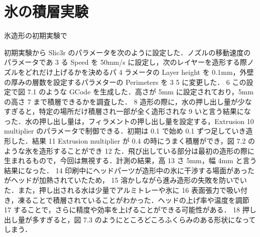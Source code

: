 \section{氷の積層実験}
\label{sec:paragraph}
氷造形の初期実験で




初期実験から Slic3r のパラメータを次のように設定した．ノズルの移動速度のパラメータであ
3 る Speed を 50mm/s に設定し，次のレイヤーを造形する際ノズルをどれだけ上げるかを決めるパ
4 ラメータの Layer height を 0.1mm，外壁の厚みの層数を設定するパラメターの Perimeters を 3
5 に変更した．
6 この設定で図 7.1 のような GCode を生成した．高さが 5mm に設定されており，5mm の高さ
7 まで積層できるかを調査した．
8 造形の際に，水の押し出し量が少なすぎると，特定の場所だけ積層され一部が全く造形されな
9 いと言う結果になった．水の押し出し量は，フィラメントの押し出し量を設定する，Extrusion
10 multiplier のパラメータで制御できる．初期は 0.1 で始め 0.1 ずつ足していき造形した．結果
11 Extrusion multiplier が 0.4 の時にうまく積層ができ，図 7.2 のような氷を造形することができ
12 た．飛び出している部分は最初の造形の際に生まれるもので，今回は無視する．計測の結果，高
13 さ 5mm，幅 4mm と言う結果になった．
14 印刷中にヘッドパーツが造形中の氷に干渉する場面があったがヘッドが加熱されていたため，
15 溶かしながら進み造形の失敗を防いでいた．また，押し出される水は少量でアルミトレーや氷に
16 表面張力で吸い付き，凍ることで積層されていることがわかった．ヘッドの上げ率や温度を調節
17 することで，さらに精度や効率を上げることができる可能性がある．
18 押し出し量が多すぎると，図 7.3 のようにところどころふくらみのある形状になってしまう．




